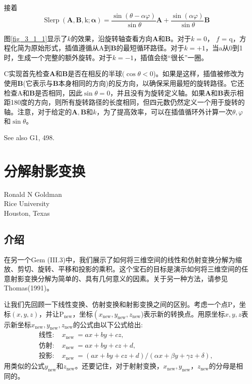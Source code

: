 接着
$$
\operatorname{Slerp}(\mathbf{A}, \mathbf{B}, \mathrm{k} ; \boldsymbol{\alpha})=\frac{\sin (\theta-\alpha \varphi)}{\sin \theta} \mathbf{A}+\frac{\sin (\alpha \varphi)}{\sin \theta} \mathbf{B}
$$

图\ref{fig_3_1_1}显示了$k$的效果，沿旋转轴查看方向$\mathbf{A}$和$\mathbf{B}$。对于$k=0$， $f$ = $\mathrm{q}$，方程化简为原始形式，插值遵循从A到$\mathbf{B}$的最短循环路径。对于$k=+1$，当a从0到1时，生成一个完整的额外旋转。对于$k=-1$，插值会绕“很长”一圈。

C实现首先检查$\mathbf{A}$和$\mathbf{B}$是否在相反的半球$(\cos \theta<0$)。如果是这样，插值被修改为使用$\mathbf{B}$(它表示与$\mathbf{B}$本身相同的方向)的反方向，以确保采用最短的旋转路径。它还检查A和$\mathbf{B}$是否相同，因此$\sin \theta=0$，并且没有为旋转定义轴。如果$\mathbf{A}$和$\mathbf{B}$表示相距180度的方向，则所有旋转路径的长度相同，但四元数仍然定义一个用于旋转的轴。注意，对于给定的$\mathbf{A}, \mathbf{B}$和$k$，为了提高效率，可以在插值循环外计算一次$\theta, \varphi$和$\sin \theta$。

See also G1, 498.


\newpage
\section{分解射影变换}
\begin{center}
\small{
Ronald N Goldman\\
Rice University\\
Houston, Texas}
\end{center}

\subsection*{介绍}
在另一个Gem (III.3)中，我们展示了如何将三维空间的线性和仿射变换分解为缩放、剪切、旋转、平移和投影的乘积。这个宝石的目标是演示如何将三维空间的任意射影变换分解为简单的、具有几何意义的因素。关于另一种方法，请参见Thomas(1991)。

让我们先回顾一下线性变换、仿射变换和射影变换之间的区别。考虑一个点$\mathrm{P}$，坐标$(x, y, z)$，并让$\mathrm{P}_{\text{new}}$，坐标$\left(x_{\text{new}}, y_{\text{new}}, z_{\text {new}}\right.$)表示新的转换点。用原坐标$x, y, z$表示新坐标$x_{\text {new}}, y_{\text {new}}, z_{\text {new}}$的公式由以下公式给出:
$$
\begin{aligned}
\text{线性:      }&x_{\text {new }}=a x+b y+c z, \\
\text{仿射:      }&x_{\text {new }}=a x+b y+c z+d, \\
\text{投影:      }&x_{\text {new }}=(a x+b y+c z+d) /(\alpha x+\beta y+\gamma z+\delta),
\end{aligned}
$$
用类似的公式$y_{\text {new}}$和$z_{\text {new}}$。还要记住，对于射射变换，$x_{\text {new}}, y_{\text {new}}， z_{\text {new}}$的分母是相同的。

